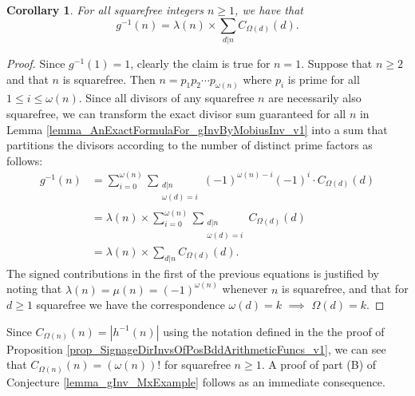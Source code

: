 \documentclass[11pt,reqno,a4letter]{article}
\numberwithin{figure}{section}
\numberwithin{table}{section}
\theoremstyle{plain}
\newtheorem{cor}[theorem]{Corollary}
\numberwithin{theorem}{section}
\theoremstyle{definition}
\begin{document}
\begin{cor} 
\label{cor_AnExactFormulaFor_gInvByMobiusInv_nSqFree_v2} 
For all squarefree integers $n \geq 1$, we have that 
\begin{equation} 
\label{eqn_gInvnSqFreeN_exactDivSum_Formula} 
g^{-1}(n) = \lambda(n) \times \sum_{d|n} C_{\Omega(d)}(d). 
\end{equation} 
\end{cor} 
\begin{proof} 
Since $g^{-1}(1) = 1$, clearly the claim is true for $n = 1$. Suppose that $n \geq 2$ and that 
$n$ is squarefree. Then $n = p_1p_2 \cdots p_{\omega(n)}$ where $p_i$ is prime for all 
$1 \leq i \leq \omega(n)$. Since all divisors of any squarefree $n$ are necessarily also squarefree, 
we can transform the exact divisor sum guaranteed for all $n$ in 
Lemma \ref{lemma_AnExactFormulaFor_gInvByMobiusInv_v1} into a sum that partitions the divisors 
according to the number of distinct prime factors as follows: 
\begin{align*} 
g^{-1}(n) & = \sum_{i=0}^{\omega(n)} \sum_{\substack{d|n \\ \omega(d)=i}} (-1)^{\omega(n) - i} (-1)^{i} \cdot 
     C_{\Omega(d)}(d) \\ 
     & = \lambda(n) \times \sum_{i=0}^{\omega(n)} \sum_{\substack{d|n \\ \omega(d)=i}} C_{\Omega(d)}(d) \\ 
     & = \lambda(n) \times \sum_{d|n} C_{\Omega(d)}(d). 
\end{align*} 
The signed contributions in the first of the previous equations is 
justified by noting that $\lambda(n) = \mu(n) = (-1)^{\omega(n)}$ 
whenever $n$ is squarefree, and that for $d \geq 1$
squarefree we have the correspondence 
$\omega(d) = k$ $\implies$ $\Omega(d) = k$. 
\end{proof} 

Since $C_{\Omega(n)}(n) = |h^{-1}(n)|$ using the notation defined in the the proof of 
Proposition \ref{prop_SignageDirInvsOfPosBddArithmeticFuncs_v1}, we can see that 
$C_{\Omega(n)}(n) = (\omega(n))!$ for squarefree $n \geq 1$. 
A proof of part (B) of Conjecture \ref{lemma_gInv_MxExample} 
follows as an immediate consequence. 
\end{document}
